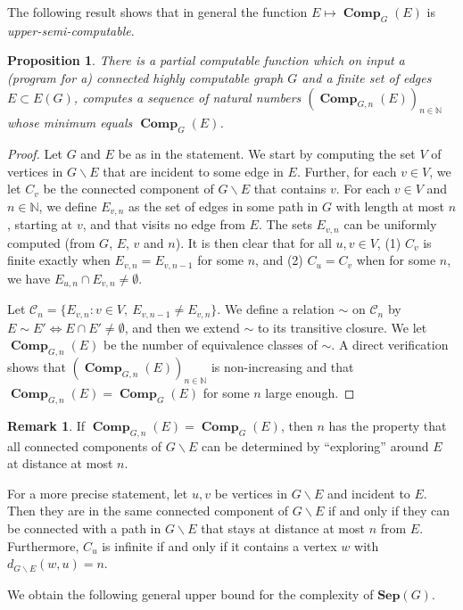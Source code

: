 \documentclass[10pt,A4]{amsart}
\newtheorem{prop}[thm]{Proposition}
\theoremstyle{definition}
\newtheorem{rmk}[thm]{Remark}
\theoremstyle{definition}
\newcommand{\N}{\mathbb{N}}
\newcommand{\sep}[1]{\mathbf{Sep}({#1})}
\renewcommand{\mid}{ : }
\newcommand{\comp}{\operatorname{\mathbf{Comp}}}
\begin{document}
The following result shows that in general  the function $E\mapsto\comp_G(E)$ is \emph{upper-semi-computable}. 
\begin{prop}
\label{prop:comp-is-upper-computable}
There is a partial computable function which on input a (program for a) connected highly computable graph $G$ and a finite set of edges $E\subset E(G)$, computes a  sequence of natural numbers $(\comp_{G,n}(E))_{n\in\N}$ whose minimum equals $\comp_{G}(E)$.
\end{prop}

\begin{proof}
Let $G$ and $E$ be as in the statement. We start by computing the set $V$ of vertices in $G\smallsetminus E$ that are incident to some edge
in $E$. Further, for each $v\in V$, we let $C_{v}$ be the connected
component of $G\smallsetminus E$ that contains $v$. For each $v\in V$ and $n\in\N$, we define $E_{v,n}$
as the set of edges in some path in $G$ with length at most $n$, starting at $v$, and that visits no edge from $E$. The sets $E_{v,n}$ can be uniformly computed (from $G$, $E$,
$v$ and $n$).  It is then clear that for all $u,v\in V$, (1) $C_{v}$ is finite exactly when $E_{v,n}=E_{v,n-1}$ for some $n$, and (2) $C_{u}=C_{v}$ when for some $n$, we have $E_{u,n}\cap E_{v,n}\ne\emptyset$. 


Let $\mathcal C _n=\{E_{v,n} \mid v\in V, \ E_{v,n-1}\ne E_{v,n}\}$. We define a relation $\sim$ on $\mathcal C_n$ by  $E\sim E'\iff E\cap E'\ne\emptyset$, and then we extend $\sim$ to its transitive closure. We let $\comp_{G,n}(E)$ be the number of equivalence classes of $\sim$. A direct verification shows that $(\comp_{G,n}(E))_{n\in\N}$ is non-increasing and that $\comp_{G,n}(E)=\comp_G(E)$ for some $n$ large enough.  
\end{proof}
\begin{rmk}\label{comp-function-extra-obs}
    If $\comp_{G,n}(E)=\comp_G(E)$, then $n$ has the property that all connected components of $G\smallsetminus E$ can be determined by ``exploring'' around $E$ at distance at most $n$. 
    
    For a more precise statement, let  $u,v$ be vertices in $G\smallsetminus E$  and incident to $E$. Then they are in the same connected component of $G\smallsetminus E$ if and only if they can be connected with a path in $G\smallsetminus E$ that stays at distance at most $n$ from $E$. 
    Furthermore, $C_u$ is infinite if and only if it contains a vertex $w$ with  $d_{G\smallsetminus E}(w,u)=n$. 
\end{rmk}
We obtain the following general upper bound for the complexity of $\sep{G}$. 
\end{document}
